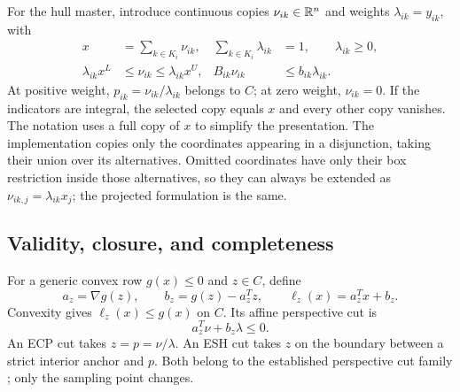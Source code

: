 For the hull master, introduce continuous copies $\nu_{ik}\in\mathbb{R}^n$ and weights $\lambda_{ik}=y_{ik}$, with
\begin{subequations}\label{eq:hull-affine}
\begin{align}
 x&=\sum_{k\in K_i}\nu_{ik},&\sum_{k\in K_i}\lambda_{ik}&=1,\qquad\lambda_{ik}\ge0,\\
 \lambda_{ik}x^L&\le\nu_{ik}\le\lambda_{ik}x^U,&B_{ik}\nu_{ik}&\le b_{ik}\lambda_{ik}.
\end{align}
\end{subequations}
At positive weight, $p_{ik}=\nu_{ik}/\lambda_{ik}$ belongs to $C$; at zero weight, $\nu_{ik}=0$. If the indicators are integral, the selected copy equals $x$ and every other copy vanishes. The notation uses a full copy of $x$ to simplify the presentation. The implementation copies only the coordinates appearing in a disjunction, taking their union over its alternatives. Omitted coordinates have only their box restriction inside those alternatives, so they can always be extended as $\nu_{ik,j}=\lambda_{ik}x_j$; the projected formulation is the same.

\subsection{Validity, closure, and completeness}
For a generic convex row $g(x)\le0$ and $z\in C$, define
\begin{equation}\label{eq:tangent}
 a_z=\nabla g(z),\qquad b_z=g(z)-a_z^Tz,\qquad
 \ell_z(x)=a_z^Tx+b_z.
\end{equation}
Convexity gives $\ell_z(x)\le g(x)$ on $C$. Its affine perspective cut is
\begin{equation}\label{eq:perspective-cut}
 a_z^T\nu+b_z\lambda\le0.
\end{equation}
An ECP cut takes $z=p=\nu/\lambda$. An ESH cut takes $z$ on the boundary between a strict interior anchor and $p$. Both belong to the established perspective cut family \citep{frangioni2006,bestuzheva2023}; only the sampling point changes.

